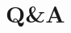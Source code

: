 \documentclass{article}
\begin{document}
	\newpage
	\section{Q\&A}
	{\let\section\subsection
	\let\subsection\subsubsection
	
	}
\end{document}
